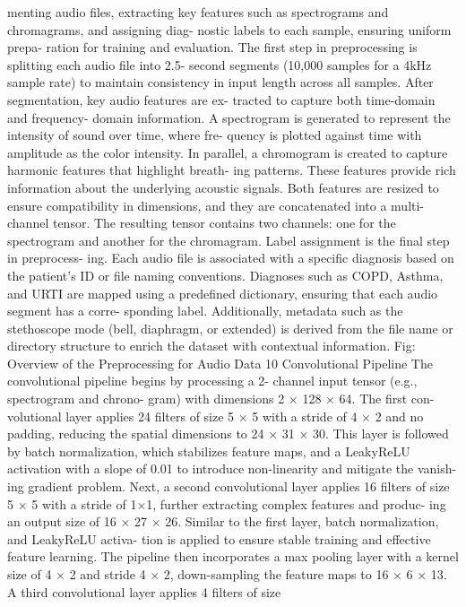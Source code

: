menting audio files, extracting key features such as
spectrograms and chromagrams, and assigning diag-
nostic labels to each sample, ensuring uniform prepa-
ration for training and evaluation. The first step
in preprocessing is splitting each audio file into 2.5-
second segments (10,000 samples for a 4kHz sample
rate) to maintain consistency in input length across
all samples.
After segmentation, key audio features are ex-
tracted to capture both time-domain and frequency-
domain information. A spectrogram is generated to
represent the intensity of sound over time, where fre-
quency is plotted against time with amplitude as the
color intensity. In parallel, a chromogram is created
to capture harmonic features that highlight breath-
ing patterns. These features provide rich information
about the underlying acoustic signals. Both features
are resized to ensure compatibility in dimensions, and
they are concatenated into a multi-channel tensor.
The resulting tensor contains two channels: one for
the spectrogram and another for the chromagram.
Label assignment is the final step in preprocess-
ing. Each audio file is associated with a specific
diagnosis based on the patient’s ID or file naming
conventions. Diagnoses such as COPD, Asthma,
and URTI are mapped using a predefined dictionary,
ensuring that each audio segment has a corre-
sponding label. Additionally, metadata such as the
stethoscope mode (bell, diaphragm, or extended)
is derived from the file name or directory structure
to enrich the dataset with contextual information.
Fig: Overview of the Preprocessing for Audio Data
10 Convolutional Pipeline
The convolutional pipeline begins by processing a 2-
channel input tensor (e.g., spectrogram and chrono-
gram) with dimensions 2 × 128 × 64. The first con-
volutional layer applies 24 filters of size 5 × 5 with a
stride of 4 × 2 and no padding, reducing the spatial
dimensions to 24 × 31 × 30. This layer is followed by
batch normalization, which stabilizes feature maps,
and a LeakyReLU activation with a slope of 0.01
to introduce non-linearity and mitigate the vanish-
ing gradient problem. Next, a second convolutional
layer applies 16 filters of size 5 × 5 with a stride of
1×1, further extracting complex features and produc-
ing an output size of 16 × 27 × 26. Similar to the first
layer, batch normalization, and LeakyReLU activa-
tion is applied to ensure stable training and effective
feature learning.
The pipeline then incorporates a max pooling
layer with a kernel size of 4 × 2 and stride 4 × 2,
down-sampling the feature maps to 16 × 6 × 13.
A third convolutional layer applies 4 filters of size
